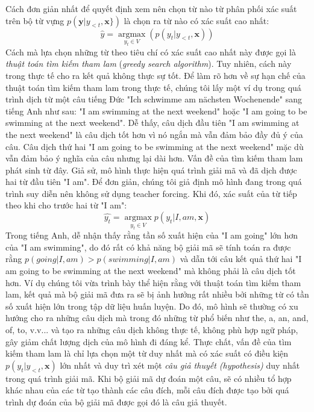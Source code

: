Cách đơn giản nhất để quyết định xem nên chọn từ nào từ phân phối xác suất trên bộ từ vựng $p(\bm{y} | y_{<t}, \bm{x}\})$ là chọn ra từ nào có xác suất cao nhất:
\begin{equation}
\hat{y} = \operatorname*{argmax}_{y_t \in V} (p(y_t | y_{<t}, \bm{x}))
\end{equation}
Cách mà lựa chọn những từ theo tiêu chí có xác suất cao nhất này được gọi là \textit{thuật toán tìm kiếm tham lam} (\textit{greedy search algorithm}). Tuy nhiên, cách này trong thực tế cho ra kết quả không thực sự tốt. Để làm rõ hơn về sự hạn chế của thuật toán tìm kiếm tham lam trong thực tế, chúng tôi lấy một ví dụ trong quá trình dịch từ một câu tiếng Đức "Ich schwimme am nächsten Wochenende" sang tiếng Anh như sau: "I am swimming at the next weekend" hoặc "I am going to be swimming at the next weekend". Dễ thấy, câu dịch đầu tiên "I am swimming at the next weekend" là câu dịch tốt hơn vì nó ngắn mà vẫn đảm bảo đầy đủ ý của câu. Câu dịch thứ hai "I am going to be swimming at the next weekend" mặc dù vẫn đảm bảo ý nghĩa của câu nhưng lại dài hơn. Vấn đề của tìm kiếm tham lam phát sinh từ đây. Giả sử, mô hình thực hiện quá trình giải mã và đã dịch được hai từ đầu tiên "I am". Để đơn giản, chúng tôi giả định mô hình đang trong quá trình suy diễn nên không sử dụng teacher forcing. Khi đó, xác suất của từ tiếp theo khi cho trước hai từ "I am":
\begin{equation*}
\hat{y_t} = \operatorname*{argmax}_{y_t \in V} p(y_t | I, am, \bm{x})
\end{equation*}
Trong tiếng Anh, dễ nhận thấy rằng tần số xuất hiện của "I am going" lớn hơn của "I am swimming", do đó rất có khả năng bộ giải mã sẽ tính toán ra được rằng $p(going | I, am) > p(swimming|I, am)$ và dẫn tới câu kết quả thứ hai "I am going to be swimming at the next weekend" mà không phải là câu dịch tốt hơn. Ví dụ chúng tôi vừa trình bày thể hiện rằng với thuật toán tìm kiếm tham lam, kết quả mà bộ giải mã đưa ra sẽ bị ảnh hưởng rất nhiều bởi những từ có tần số xuất hiện lớn trong tập dữ liệu huấn luyện. Do đó, mô hình sẽ thường có xu hướng cho ra những câu dịch mà trong đó những từ phổ biến như the, a, an, and, of, to, v.v... và tạo ra những câu dịch không thực tế, không phù hợp ngữ pháp, gây giảm chất lượng dịch của mô hình đi đáng kể. Thực chất, vấn đề của tìm kiếm tham lam là chỉ lựa chọn một từ duy nhất mà có xác suất có điều kiện $p(y_t | y_{<t}, \bm{x})$ lớn nhất và duy trì xét một \textit{câu giả thuyết (hypothesis)} duy nhất trong quá trình giải mã. Khi bộ giải mã dự đoán một câu, sẽ có nhiều tổ hợp khác nhau của các từ tạo thành các câu đích, mỗi câu đích được tạo bởi quá trình dự đoán của bộ giải mã được gọi đó là câu giả thuyết.


